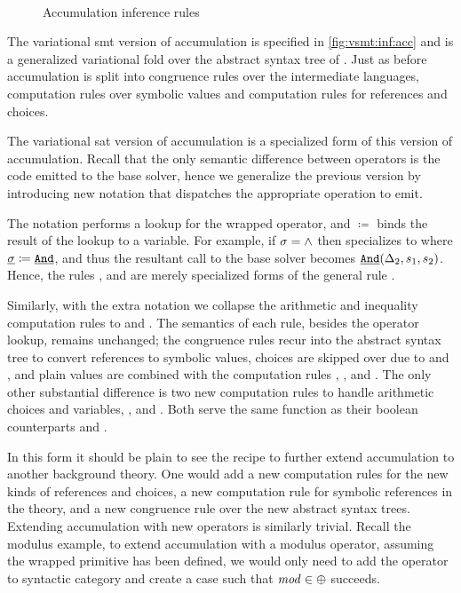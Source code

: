 ~\label{section:vsmt:accumulation}
%
\begin{figure}
  
  \caption{Accumulation inference rules}%
  \label{fig:vsmt:inf:acc}
\end{figure}
%
%
The variational \ac{smt} version of accumulation is specified in
\autoref{fig:vsmt:inf:acc} and is a generalized variational fold over the
abstract syntax tree of \eIL. Just as before accumulation is split into
congruence rules over the intermediate languages, computation rules over
symbolic values and computation rules for references and choices.

The variational \ac{sat} version of accumulation is a specialized form of this
version of accumulation. Recall that the only semantic difference between
operators is the code emitted to the base solver, hence we generalize the
previous version by introducing new notation that dispatches the appropriate
operation to emit.

The notation \lookup{\op}{\boolFuncs} performs a lookup for the wrapped
operator, and $\coloneqq$ binds the result of the lookup to a variable. For
example, if $\sigma = \wedge$ then \acBoolS{} specializes to \acAndS{} where
$\underline{\sigma} \coloneqq \underline{\texttt{And}}$, and thus the resultant call to the base
solver becomes $\underline{\texttt{And}}(\Delta_{2}, s_1, s_2)$. Hence, the rules
\acAndS{}, and \acOrS{} are merely specialized forms of the general rule
\acBoolS. 

Similarly, with the extra notation we collapse the arithmetic and inequality
computation rules to \acArithS{} and \acInEqS{}. The semantics of each rule,
besides the operator lookup, remains unchanged; the congruence rules recur into
the abstract syntax tree to convert references to symbolic values, choices are
skipped over due to \acChc{} and \acChcI{}, and plain values are combined with
the computation rules \acBoolS, \acArithS, and \acInEqS.
%
The only other substantial difference is two new computation rules to handle
arithmetic choices and variables, \acChcI{}, and \acRefI{}. Both serve the same
function as their boolean counterparts \acChc{} and \acRef{}. 

In this form it should be plain to see the recipe to further extend accumulation
to another background theory. One would add a new computation rules for the new
kinds of references and choices, a new computation rule for symbolic references
in the theory, and a new congruence rule over the new abstract syntax trees.
Extending accumulation with new operators is similarly trivial. Recall the
modulus example, to extend accumulation with a modulus operator, assuming the
wrapped primitive has been defined, we would only need to add the operator to
\integerFuncs{} syntactic category and create a case such that $\mathit{mod} \in
\oplus{}{}$ succeeds.



